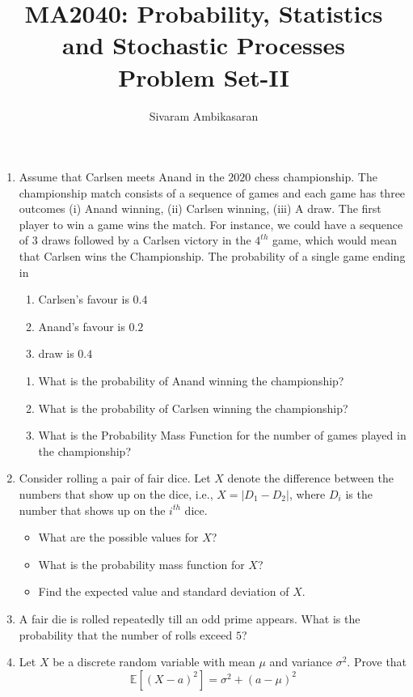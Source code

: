 \documentclass{article}
\title{MA2040: Probability, Statistics and Stochastic Processes\\
Problem Set-II}
\author{Sivaram Ambikasaran}
\newcommand{\abs}[1]{\displaystyle\left\lvert#1\right\rvert}
\newcommand{\bkt}[1]{\left(#1\right)}
\begin{document}
	\maketitle
	\begin{enumerate}
		\item
		Assume that Carlsen meets Anand in the $2020$ chess championship. The championship match consists of a sequence of games and each game has three outcomes (i) Anand winning, (ii) Carlsen winning, (iii) A draw. The first player to win a game wins the match. For instance, we could have a sequence of $3$ draws followed by a Carlsen victory in the $4^{th}$ game, which would mean that Carlsen wins the Championship. The probability of a single game ending in
		\begin{enumerate}
			\item
			Carlsen's favour is $0.4$
			\item
			Anand's favour is $0.2$
			\item
			draw is $0.4$
		\end{enumerate}
		\begin{enumerate}[i]
			\item
			What is the probability of Anand winning the championship?
			\item
			What is the probability of Carlsen winning the championship?
			\item
			What is the Probability Mass Function for the number of games played in the championship?
		\end{enumerate}
		\item
		Consider rolling a pair of fair dice. Let $X$ denote the difference between the numbers that show up on the dice, i.e., $X = \abs{D_1-D_2}$, where $D_i$ is the number that shows up on the $i^{th}$ dice.
		\begin{itemize}
			\item
			What are the possible values for $X$?
			\item
			What is the probability mass function for $X$?
			\item
			Find the expected value and standard deviation of $X$.
		\end{itemize}
		\item
		A fair die is rolled repeatedly till an odd prime appears. What is the probability that the number of rolls exceed $5$?
		\item
		Let $X$ be a discrete random variable with mean $\mu$ and variance $\sigma^2$. Prove that
		$$\mathbb{E}\left[\bkt{X-a}^2\right] = \sigma^2 + \bkt{a-\mu}^2$$

\end{enumerate}
\end{document}
